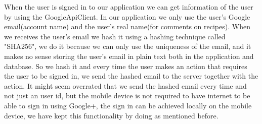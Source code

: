 When the user is signed in to our application we can get information of the user by using the GoogleApiClient.
In our application we only use the user's Google email(account name) and the user's real name(for comments on recipes). 
When we receives the user's email we hash it using a hashing technique called "SHA256", we do it because we can only use the uniqueness of the email, and it makes no sense storing the user's email in plain text both in the application and database. So we hash it and every time the user makes an action that requires the user to be signed in, we send the hashed email to the server together with the action. It might seem overrated that we send the hashed email every time and not just an user id, but the mobile device is not required to have internet to be able to sign in using Google+, the sign in can be achieved locally on the mobile device, we have kept this functionality by doing as mentioned before.

